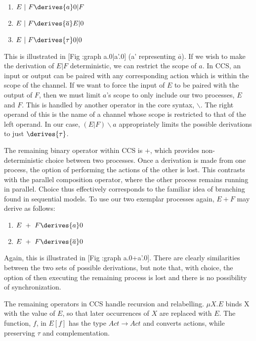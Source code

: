\begin{enumerate}
\item $E\ |\ F \derives{a} 0|F$
\item $E\ |\ F \derives{\overline{a}} E|0$
\item $E\ |\ F \derives{\tau} 0|0$
\end{enumerate}

This is illustrated in [Fig :graph a.0|a'.0] (a' representing
$\overline{a}$).  If we wish to make the derivation of $E|F$
deterministic, we can restrict the scope of $a$.  In CCS, an input or
output can be paired with any corresponding action which is within the
scope of the channel.  If we want to force the input of $E$ to be paired
with the output of $F$, then we must limit $a$'s scope to only include
our two processes, $E$ and $F$.  This is handled by another operator in
the core syntax, $\backslash$.  The right operand of this is the name of
a channel whose scope is restricted to that of the left operand.  In our
case, $(E|F)\backslash a$ appropriately limits the possible derivations
to just $\derives{\tau}$.

The remaining binary operator within CCS is $+$, which provides
non-deterministic choice between two processes.  Once a derivation is
made from one process, the option of performing the actions of the other
is lost.  This contrasts with the parallel composition operator, where
the other process remains running in parallel.  Choice thus effectively
corresponds to the familiar idea of branching found in sequential
models.  To use our two exemplar processes again, $E + F$ may derive as
follows:

\begin{enumerate}
\item $E\ +\ F \derives{a} 0$
\item $E\ +\ F \derives{\overline{a}} 0$
\end{enumerate}

Again, this is illustrated in [Fig :graph a.0+a'.0].  There are clearly
similarities between the two sets of possible derivations, but note
that, with choice, the option of then executing the remaining process is
lost and there is no possibility of synchronization.

The remaining operators in CCS handle recursion and relabelling.  $\mu
X.E$ binds X with the value of $E$, so that later occurrences of $X$ are
replaced with $E$.  The function, $f$, in $E[f]$ has the type $Act
\rightarrow Act$ and converts actions, while preserving $\tau$ and
complementation.


